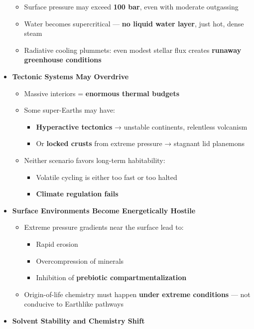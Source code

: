 \documentclass[
  letterpaper,
]{book}
\providecommand{\tightlist}{%
  \setlength{\itemsep}{0pt}\setlength{\parskip}{0pt}}
\begin{document}
\begin{itemize}
  \begin{itemize}
  \tightlist
  \item
    Surface pressure may exceed \textbf{100 bar}, even with moderate
    outgassing
  \item
    Water becomes supercritical --- \textbf{no liquid water layer}, just
    hot, dense steam
  \item
    Radiative cooling plummets: even modest stellar flux creates
    \textbf{runaway greenhouse conditions}
  \end{itemize}
\item
  \textbf{Tectonic Systems May Overdrive}

  \begin{itemize}
  \tightlist
  \item
    Massive interiors = \textbf{enormous thermal budgets}
  \item
    Some super-Earths may have:

    \begin{itemize}
    \tightlist
    \item
      \textbf{Hyperactive tectonics} → unstable continents, relentless
      volcanism
    \item
      Or \textbf{locked crusts} from extreme pressure → stagnant lid
      planemons
    \end{itemize}
  \item
    Neither scenario favors long-term habitability:

    \begin{itemize}
    \tightlist
    \item
      Volatile cycling is either too fast or too halted
    \item
      \textbf{Climate regulation fails}
    \end{itemize}
  \end{itemize}
\item
  \textbf{Surface Environments Become Energetically Hostile}

  \begin{itemize}
  \tightlist
  \item
    Extreme pressure gradients near the surface lead to:

    \begin{itemize}
    \tightlist
    \item
      Rapid erosion
    \item
      Overcompression of minerals
    \item
      Inhibition of \textbf{prebiotic compartmentalization}
    \end{itemize}
  \item
    Origin-of-life chemistry must happen \textbf{under extreme
    conditions} --- not conducive to Earthlike pathways
  \end{itemize}
\item
  \textbf{Solvent Stability and Chemistry Shift}


\end{itemize}
\end{document}
